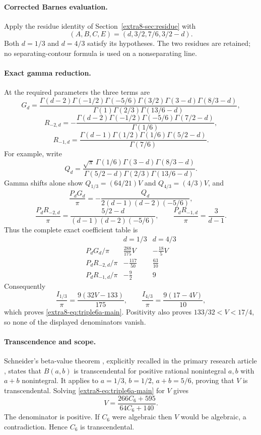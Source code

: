 \documentclass[11pt,a4paper]{article}
\theoremstyle{definition}
\theoremstyle{remark}
\numberwithin{equation}{section}
\begin{document}
\paragraph{Corrected Barnes evaluation.}
Apply the residue identity of Section~\ref{extra8-sec:residue} with
\[
(A,B,C,E)=(d,3/2,7/6,3/2-d).
\]
Both $d=1/3$ and $d=4/3$ satisfy its hypotheses. The two residues are retained;
no separating-contour formula is used on a nonseparating line.

\paragraph{Exact gamma reduction.}
At the required parameters the three terms are
\[
 G_d=\frac{\Gamma(d-2)\Gamma(-1/2)\Gamma(-5/6)
 \Gamma(3/2)\Gamma(3-d)\Gamma(8/3-d)}
 {\Gamma(1)\Gamma(2/3)\Gamma(13/6-d)},
\]
\[
 R_{-2,d}=-\frac{\Gamma(d-2)\Gamma(-1/2)\Gamma(-5/6)
 \Gamma(7/2-d)}{\Gamma(1/6)},
\]
\[
 R_{-1,d}=\frac{\Gamma(d-1)\Gamma(1/2)\Gamma(1/6)
 \Gamma(5/2-d)}{\Gamma(7/6)}.
\]
For example, write
\[
 Q_d=\frac{\sqrt\pi\,\Gamma(1/6)\Gamma(3-d)\Gamma(8/3-d)}
 {\Gamma(5/2-d)\Gamma(2/3)\Gamma(13/6-d)}.
\]
Gamma shifts alone show $Q_{1/3}=(64/21)V$ and
$Q_{4/3}=(4/3)V$, and
\[
 \frac{P_dG_d}{\pi}
 =-\frac{Q_d}{2(d-1)(d-2)(-5/6)},
\]
\[
 \frac{P_dR_{-2,d}}{\pi}
 =\frac{5/2-d}{(d-1)(d-2)(-5/6)},\qquad
 \frac{P_dR_{-1,d}}{\pi}=\frac3{d-1}.
\]
Thus the complete exact coefficient table is
\[
\begin{array}{c|cc}
 &d=1/3&d=4/3\\ \hline
 P_dG_d/\pi&\frac{288}{175}V&-\frac{18}{5}V\\[2pt]
 P_dR_{-2,d}/\pi&-\frac{117}{50}&\frac{63}{10}\\[2pt]
 P_dR_{-1,d}/\pi&-\frac92&9
\end{array}
\]
Consequently
\[
 \frac{I_{1/3}}\pi=\frac{9(32V-133)}{175},\qquad
 \frac{I_{4/3}}\pi=\frac{9(17-4V)}{10},
\]
which proves \eqref{extra8-eq:triple6a-main}. Positivity also proves
$133/32<V<17/4$, so none of the displayed denominators vanish.

\paragraph{Transcendence and scope.}
Schneider's beta-value theorem \cite{extra8-schneider}, explicitly
recalled in the primary research article \cite{extra8-dhillon-saha}, states
that $B(a,b)$ is transcendental for positive rational nonintegral
$a,b$ with $a+b$ nonintegral. It applies to
$a=1/3$, $b=1/2$, $a+b=5/6$, proving that $V$ is transcendental.
Solving \eqref{extra8-eq:triple6a-main} for $V$ gives
\[
 V=\frac{266C_6+595}{64C_6+140}.
\]
The denominator is positive. If $C_6$ were algebraic then $V$ would
be algebraic, a contradiction. Hence $C_6$ is transcendental.
\end{document}
